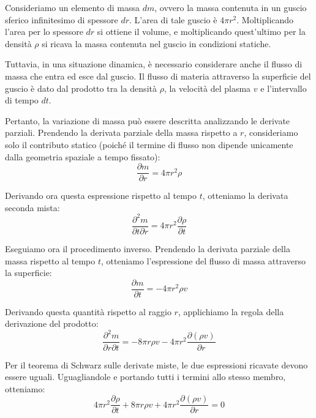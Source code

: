 Consideriamo un elemento di massa $dm$, ovvero la massa contenuta in un guscio sferico infinitesimo di spessore $dr$. L'area di tale guscio è $4\pi r^2$. Moltiplicando l'area per lo spessore $dr$ si ottiene il volume, e moltiplicando quest'ultimo per la densità $\rho$ si ricava la massa contenuta nel guscio in condizioni statiche.

Tuttavia, in una situazione dinamica, è necessario considerare anche il flusso di massa che entra ed esce dal guscio. Il flusso di materia attraverso la superficie del guscio è dato dal prodotto tra la densità $\rho$, la velocità del plasma $v$ e l'intervallo di tempo $dt$.

Pertanto, la variazione di massa può essere descritta analizzando le derivate parziali.
Prendendo la derivata parziale della massa rispetto a $r$, consideriamo solo il contributo statico (poiché il termine di flusso non dipende unicamente dalla geometria spaziale a tempo fissato):
\begin{equation}
\frac{\partial m}{\partial r} = 4\pi r^2 \rho
\end{equation}

Derivando ora questa espressione rispetto al tempo $t$, otteniamo la derivata seconda mista:
\begin{equation}
\frac{\partial^2 m}{\partial t \partial r} = 4\pi r^2 \frac{\partial \rho}{\partial t}
\end{equation}

Eseguiamo ora il procedimento inverso. Prendendo la derivata parziale della massa rispetto al tempo $t$, otteniamo l'espressione del flusso di massa attraverso la superficie:
\begin{equation}
\frac{\partial m}{\partial t} = -4\pi r^2 \rho v
\end{equation}

Derivando questa quantità rispetto al raggio $r$, applichiamo la regola della derivazione del prodotto:
\begin{equation}
\frac{\partial^2 m}{\partial r \partial t} = -8\pi r \rho v - 4\pi r^2 \frac{\partial (\rho v)}{\partial r}
\end{equation}

Per il teorema di Schwarz sulle derivate miste, le due espressioni ricavate devono essere uguali. Uguagliandole e portando tutti i termini allo stesso membro, otteniamo:
\begin{equation}
4\pi r^2 \frac{\partial \rho}{\partial t} + 8\pi r \rho v + 4\pi r^2 \frac{\partial (\rho v)}{\partial r} = 0
\end{equation}

